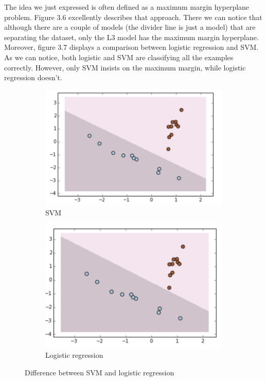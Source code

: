 \documentclass[times, utf8, seminar]{fer}
\begin{document}
The idea we just expressed is often defined as a maximum margin hyperplane problem. Figure 3.6 excellently describes that approach. There we can notice that although there are a couple of models (the divider line is just a model) that are separating the dataset, only the L3 model has the maximum margin hyperplane. Moreover, figure 3.7 displays a comparison between logistic regression and SVM. As we can notice, both logistic and SVM are classifying all the examples correctly. However, only SVM insists on the maximum margin, while logistic regression doesn't.

\begin{figure}[ht]
	\begin{subfigure}{.5\textwidth}
		\centering
		\includegraphics[width=.8\linewidth]{svm-logistic1}  
		\caption{SVM}
		\label{fig:sub-first}
	\end{subfigure}
	\begin{subfigure}{.5\textwidth}
		\centering
		\includegraphics[width=.8\linewidth]{svm-logistic2}  
		\caption{Logistic regression}
		\label{fig:sub-second}
	\end{subfigure}
	\caption{Difference between SVM and logistic regression \protect \footnotemark}
	\label{fig:fig}
\end{figure}
\end{document}

